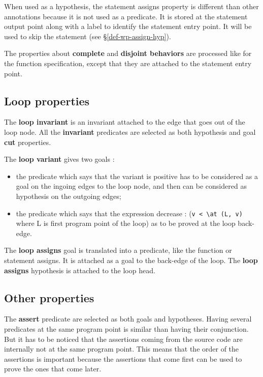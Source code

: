 When used as a hypothesis, the statement assigns property is different
than other annotations because it is not used as a predicate.
It is stored at the statement output point along with a label to identify the
statement entry point. It will be used to skip the statement
(see \S\ref{def-wp-assign-hyp}).

The properties about {\bf complete} and {\bf disjoint behaviors} are processed
like for the function specification, except that they are  attached to the statement entry point.

\subsection{Loop properties}

The {\bf loop invariant} is an invariant attached to the edge that goes 
out of the loop node. 
All the {\bf invariant} predicates are selected as both hypothesis and goal
{\bf cut} properties.

The {\bf loop variant} gives two goals :
\begin{itemize}
  \item the predicate which says that the variant is positive
    has to be considered as a goal on the ingoing edges to the loop node,
    and then can be considered as hypothesis on the outgoing edges;
  \item the predicate which says that the expression decrease :
    (\verb!v < \at (L, v)! where L is first program point of the loop)
    as to be proved at the loop back-edge.
\end{itemize}

The {\bf loop assigns} goal is translated into a predicate, like the function or
statement assigns. It is attached as a goal to the back-edge of the loop.
The {\bf loop assigns} hypothesis is attached to the loop head.

\subsection{Other properties}

The {\bf assert} predicate are selected as both goals and hypotheses.
Having several predicates at the same program point is similar 
than having their conjunction.
But it has to be noticed that the assertions coming from the source code
are internally {\sc not} at the same program point. 
This means that the order of the assertions is important because
the assertions that come first can be used to prove the ones that come later.\\

